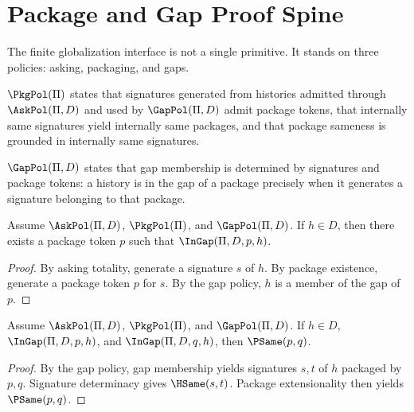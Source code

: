 
\chapter{Package and Gap Proof Spine}
\label{ch:proof-standing-package-gap-proof-spine}

The finite globalization interface is not a single primitive. It stands on three policies: asking, packaging, and gaps.

\begin{definition}
$\PkgPol(\Pi)$ states that signatures generated from histories admitted through $\AskPol(\Pi,D)$ and used by $\GapPol(\Pi,D)$ admit package tokens, that internally same signatures yield internally same packages, and that package sameness is grounded in internally same signatures.
\end{definition}

\begin{definition}
\(\GapPol(\Pi,D)\) states that gap membership is determined by signatures and package tokens: a history is in the gap of a package precisely when it generates a signature belonging to that package.
\end{definition}

\begin{theorem}
\label{thm:gap-coverage-spine}
Assume $\AskPol(\Pi,D)$, $\PkgPol(\Pi)$, and $\GapPol(\Pi,D)$. If $h\in D$, then there exists a package token $p$ such that $\InGap(\Pi,D,p,h)$.
\end{theorem}
\begin{proof}
By asking totality, generate a signature \(s\) of \(h\). By package existence, generate a package token \(p\) for \(s\). By the gap policy, \(h\) is a member of the gap of \(p\).
\end{proof}

\begin{theorem}
\label{thm:gap-separation-proof-standing}
Assume $\AskPol(\Pi,D)$, $\PkgPol(\Pi)$, and $\GapPol(\Pi,D)$. If $h\in D$, $\InGap(\Pi,D,p,h)$, and $\InGap(\Pi,D,q,h)$, then $\PSame(p,q)$.
\end{theorem}
\begin{proof}
By the gap policy, gap membership yields signatures \(s,t\) of \(h\) packaged by \(p,q\). Signature determinacy gives \(\HSame(s,t)\). Package extensionality then yields \(\PSame(p,q)\).
\end{proof}


